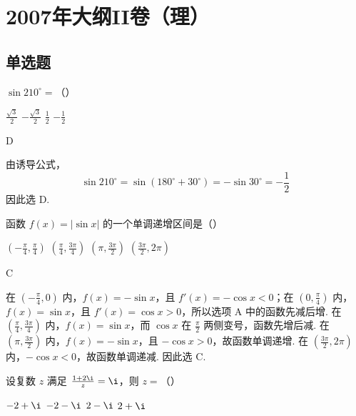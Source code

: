 \chapter{2007年大纲II卷（理）}
\section{单选题}
\begin{problem}
\(\sin 210^{\circ} =\)（\quad）

\choices
    {\(\frac{\sqrt{3}}{2}\)}
    {\(-\frac{\sqrt{3}}{2}\)}
    {\( \frac{1}{2} \)}
    {\(-\frac{1}{2}\)}
\end{problem}

\begin{answer}
D
\end{answer}

\begin{solution}
由诱导公式，
\[
\sin 210^{\circ}=\sin(180^{\circ}+30^{\circ})=-\sin30^{\circ}=-\frac{1}{2}
\]
因此选 D.
\end{solution}

\begin{problem}
函数 \( f(x) = |\sin x| \) 的一个单调递增区间是（\quad）

\choices
    {\(\left(-\frac{\pi}{4}, \frac{\pi}{4}\right)\)}
    {\(\left(\frac{\pi}{4}, \frac{3\pi}{4}\right)\)}
    {\(\left(\pi, \frac{3\pi}{2}\right)\)}
    {\(\left(\frac{3\pi}{2}, 2\pi\right)\)}
\end{problem}

\begin{answer}
C
\end{answer}

\begin{solution}
在 \(\left(-\frac{\pi}{4},0\right)\) 内，\(f(x)=-\sin x\)，且 \(f'(x)=-\cos x<0\)；在 \(\left(0,\frac{\pi}{4}\right)\) 内，\(f(x)=\sin x\)，且 \(f'(x)=\cos x>0\)，所以选项 A 中的函数先减后增. 在 \(\left(\frac{\pi}{4},\frac{3\pi}{4}\right)\) 内，\(f(x)=\sin x\)，而 \(\cos x\) 在 \(\frac{\pi}{2}\) 两侧变号，函数先增后减. 在 \(\left(\pi,\frac{3\pi}{2}\right)\) 内，\(f(x)=-\sin x\)，且 \(-\cos x>0\)，故函数单调递增. 在 \(\left(\frac{3\pi}{2},2\pi\right)\) 内，\(-\cos x<0\)，故函数单调递减. 因此选 C.
\end{solution}

\begin{problem}
设复数 \(z\) 满足 \(\frac{1 + 2\i}{z} = \i\)，则 \(z =\)（\quad）

\choices
    {\(-2 + \i\)}
    {\(-2 - \i\)}
    {\(2 - \i\)}
    {\(2 + \i\)}
\end{problem}

